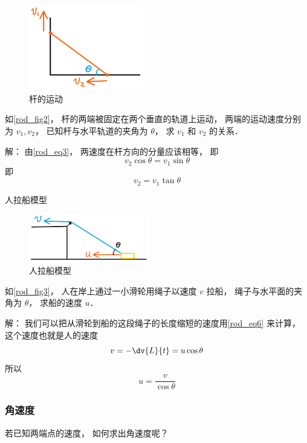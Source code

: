 \begin{example}{}\label{rod_ex1}
\begin{figure}[ht]
\centering
\includegraphics[width=5cm]{./figures/rod1.png}
\caption{杆的运动} \label{rod_fig1}
\end{figure}
如\autoref{rod_fig2}， 杆的两端被固定在两个垂直的轨道上运动， 两端的运动速度分别为 $v_1, v_2$， 已知杆与水平轨道的夹角为 $\theta$， 求 $v_1$ 和 $v_2$ 的关系．

解： 由\autoref{rod_eq3}， 两速度在杆方向的分量应该相等， 即
\begin{equation}
v_2 \cos\theta = v_1 \sin\theta
\end{equation}
即
\begin{equation}
v_2 = v_1 \tan\theta
\end{equation}
\end{example}

\begin{example}{人拉船模型}
\begin{figure}[ht]
\centering
\includegraphics[width=5.3cm]{./figures/rod3.png}
\caption{人拉船模型} \label{rod_fig3}
\end{figure}
如\autoref{rod_fig3}， 人在岸上通过一小滑轮用绳子以速度 $v$ 拉船， 绳子与水平面的夹角为 $\theta$， 求船的速度 $u$．

解： 我们可以把从滑轮到船的这段绳子的长度缩短的速度用\autoref{rod_eq6} 来计算， 这个速度也就是人的速度
\begin{equation}
v = -\dv{L}{t} = u \cos\theta
\end{equation}
所以
\begin{equation}
u = \frac{v}{\cos\theta}
\end{equation}
\end{example}

\subsubsection{角速度}
若已知两端点的速度， 如何求出角速度呢？

